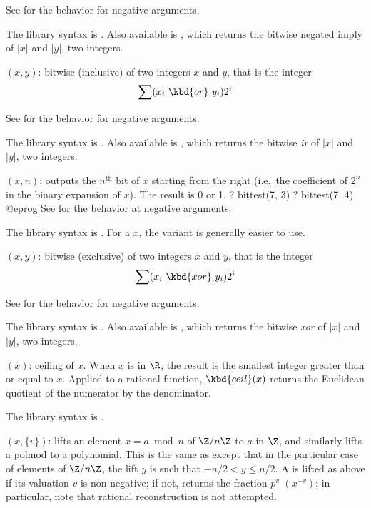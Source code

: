 See  for the behavior for negative arguments.

The library syntax is .
Also available is
, which returns the bitwise negated
imply of $|x|$ and $|y|$, two integers.

$(x,y)$: \label{se:bitor}
bitwise (inclusive)
 of two integers $x$ and $y$, that is the integer $$\sum
(x_i~\kbd{or}~y_i) 2^i$$

See  for the behavior for negative arguments.

The library syntax is .
Also available is
, which returns the bitwise \emph{ir}
of $|x|$ and $|y|$, two integers.

$(x,n)$: \label{se:bittest}
outputs the $n^{\text{th}}$ bit of $x$ starting
from the right (i.e.~the coefficient of $2^n$ in the binary expansion of $x$).
The result is 0 or 1.
\bprog
? bittest(7, 3)
? bittest(7, 4)
@eprog\noindent
See  for the behavior at negative arguments.

The library syntax is .
For a  $x$, the variant  is
generally easier to use.

$(x,y)$: \label{se:bitxor}
bitwise (exclusive) 
of two integers $x$ and $y$, that is the integer
$$\sum (x_i~\kbd{xor}~y_i) 2^i$$

See  for the behavior for negative arguments.

The library syntax is .
Also available is
, which returns the bitwise \emph{xor}
of $|x|$ and $|y|$, two integers.

$(x)$: \label{se:ceil}
ceiling of $x$. When $x$ is in $\R$, the result is the
smallest integer greater than or equal to $x$. Applied to a rational
function, $\kbd{ceil}(x)$ returns the Euclidean quotient of the numerator by
the denominator.

The library syntax is .

$(x,\{v\})$: \label{se:centerlift}
lifts an element $x=a \bmod n$ of $\Z/n\Z$
to $a$ in $\Z$, and similarly lifts a polmod to a polynomial. This is the
same as  except that in the particular case of elements of
$\Z/n\Z$, the lift $y$ is such that $-n/2<y\le n/2$.  A  is lifted
as above if its valuation $v$ is non-negative; if not, returns the fraction
$p^v$ $(x^{-v})$; in particular, note that rational
reconstruction is not attempted.

